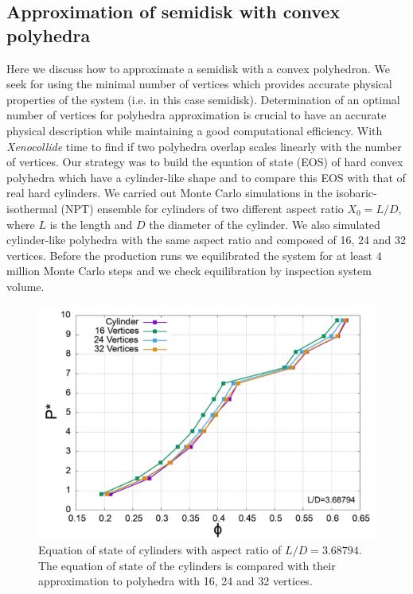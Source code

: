 \documentclass[aip,jcp, amsmath, amssymb, reprint]{revtex4-1}
\begin{document}
\subsection{Approximation of semidisk with convex polyhedra}
Here we discuss how to approximate a semidisk with a convex polyhedron. We seek for using the minimal number of vertices
which provides accurate physical properties of the system (i.e. in this case semidisk).
Determination of an optimal number of vertices for polyhedra approximation is crucial to have an accurate physical
description while maintaining a good computational efficiency.
With \textit{Xenocollide} time to find if two polyhedra overlap scales linearly with the number of vertices.
Our strategy was to build the equation of state (EOS) of hard convex polyhedra which have a cylinder-like shape and to 
compare this EOS with that of real hard cylinders.
We carried out Monte Carlo simulations in the isobaric-isothermal (NPT) ensemble for
cylinders of two different aspect ratio $X_0=L/D$, where $L$ is the length and $D$ the diameter of the cylinder. 
We also simulated cylinder-like polyhedra with the same aspect ratio and composed of 16, 24 and 32 vertices.
Before the production runs we equilibrated the system for at least $4$ million Monte Carlo steps and we check 
equilibration by inspection system volume.
\begin{figure}[h!] \includegraphics[width=0.95\linewidth]{cylapprox.png}
  \caption{\label{fig:cylapprox} Equation of state of cylinders with aspect ratio of $L/D=3.68794$. The equation of
  state of the cylinders is compared with their approximation to polyhedra with 16, 24 and 32 vertices.}
\end{figure}
\end{document}

